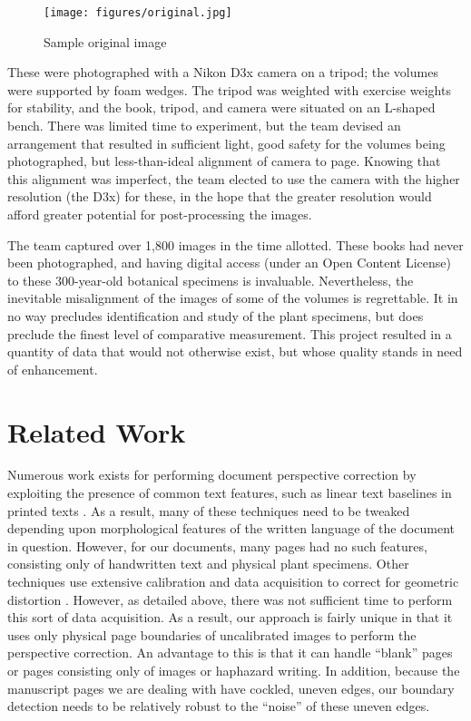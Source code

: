 \documentclass[runningheads,a4paper]{llncs}
\begin{document}
\begin{figure}[!htbm]
  \centering

  \texttt{[image: figures/original.jpg]}
  \caption{Sample original image}\label{fig:original}
\end{figure}

These were photographed with a Nikon D3x camera on a tripod; the volumes were supported by foam wedges. The tripod was weighted with exercise weights for stability, and the book, tripod, and camera were situated on an L-shaped bench. There was limited time to experiment, but the team devised an arrangement that resulted in sufficient light, good safety for the volumes being photographed, but less-than-ideal alignment of camera to page. Knowing that this alignment was imperfect, the team elected to use the camera with the higher resolution (the D3x) for these, in the hope that the greater resolution would afford greater potential for post-processing the images.

The team captured over 1,800 images in the time allotted. These books had never been photographed, and having digital access (under an Open Content License) to these 300-year-old botanical specimens is invaluable. Nevertheless, the inevitable misalignment of the images of some of the volumes is regrettable. It in no way precludes identification and study of the plant specimens, but does preclude the finest level of comparative measurement. This project resulted in a quantity of data that would not otherwise exist, but whose quality stands in need of enhancement.

\section{Related Work}

Numerous work exists for performing document perspective correction by exploiting the presence of
common text features, such as linear text baselines in printed texts
\cite{Clark:2001vj,Clark:2002wk,Clark:2003wf,Cao:2003bh,Lu:2003jy,Zhang:2005dy,Monnier:2005jj,Liang:2005hc,Ulges:2005ju,Ezaki:2005jc,Pollard:2005bp,Lu:2005ih,Avila:2005jx,Zhang:2008kj,JianLiang:2008ew,Bukhari:2009tc,Beusekom:2010dg,Luo:2011go,Rahnemoonfar:2011ux,Golpardaz:2011dz,Yang:2011dt}.
As a result, many of these techniques need to be tweaked depending upon morphological features of
the written language of the document in question.
However, for our documents,
many pages had no such features, consisting only of handwritten text and physical plant
specimens.
Other techniques use extensive calibration and data acquisition to correct for geometric distortion 
\cite{Pilu:vr,Brown:2001td,Brown:2004vl,Brown:2005uy,Brown:2007ti,LiZhang:2008bp}.
However, as detailed above, there was not sufficient time to perform this sort of data acquisition.
As a result, our approach is fairly unique in that it uses only physical page boundaries of uncalibrated images to
perform the perspective correction. An advantage to this is that it can handle “blank” pages or pages
consisting only of images or haphazard writing. In addition, because the manuscript pages we are dealing with have
cockled, uneven edges, our boundary detection needs to be relatively robust to the “noise” of these uneven edges.
\end{document}
